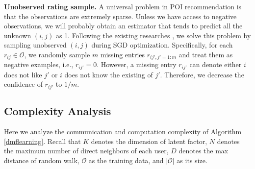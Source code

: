 
\textbf{Unobserved rating sample.} 
A universal problem in POI recommendation is that the observations are extremely sparse. 
Unless we have access to negative observations, we will probably obtain an estimator that tends to predict all the unknown $(i,j)$ as 1. 
Following the existing researches \cite{yang2011like}, we solve this problem by sampling unobserved $(i,j)$ during SGD optimization. 
Specifically, for each $r_{ij} \in \mathcal{O}$, we randomly sample $m$ missing entries $r_{{ij'}, j'=1:m}$ and treat them as negative examples, i.e., $r_{ij'}=0$. 
However, a missing entry $r_{ij'}$ can denote either $i$ does not like $j'$ or $i$ does not know the existing of $j'$. 
Therefore, we decrease the confidence of $r_{ij'}$ to $1/m$. 





\subsection{Complexity Analysis}
Here we analyze the communication and computation complexity of Algorithm \ref{dmflearning}. %
Recall that $K$ denotes the dimension of latent factor, $N$ denotes the maximum number of direct neighbors of each user, $D$ denotes the max distance of random walk, $\mathcal{O}$ as the training data, and $|\mathcal{O}|$ as its size. 

